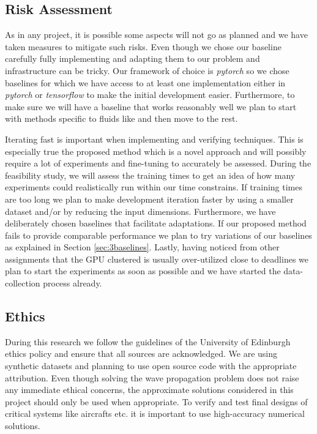 \documentclass[a4paper,11pt]{article}
\begin{document}
\subsection{Risk Assessment}
\label{sec:3risk}
As in any project, it is possible some aspects will not go as planned and we have taken measures to mitigate such risks. Even though we chose our baseline carefully fully implementing and adapting them to our problem and infrastructure can be tricky. Our framework of choice is \textit{pytorch} so we chose baselines for which we have access to at least one implementation either in \textit{pytorch} or \textit{tensorflow} to make the initial development easier. Furthermore, to make sure we will have a baseline that works reasonably well we plan to start with methods specific to fluids like \cite{sorteberg2018approximating} and then move to the rest. 

 Iterating fast is important when implementing and verifying techniques. This is especially true the proposed method which is a novel approach and will possibly require a lot of experiments and fine-tuning to accurately be assessed. During the feasibility study, we will assess the training times to get an idea of how many experiments could realistically run within our time constrains. If training times are too long we plan to make development iteration faster by using a smaller dataset and/or by reducing the input dimensions. Furthermore, we have deliberately chosen baselines that facilitate adaptations. If our proposed method fails to provide comparable performance we plan to try variations of our baselines as explained in Section \ref{sec:3baselines}. Lastly, having noticed from other assignments that the GPU clustered is usually over-utilized close to deadlines we plan to start the experiments as soon as possible and we have started the data-collection process already. 

\vskip -2mm
\subsection{Ethics}
\label{sec:3ethics}
During this research we follow the guidelines of the University of Edinburgh ethics policy and ensure that all sources are acknowledged. We are using synthetic datasets and planning to use open source code with the appropriate attribution. Even though solving the wave propagation problem does not raise any immediate ethical concerns, the approximate solutions  considered in this project should only be used when appropriate. To verify and test final designs of critical systems like aircrafts etc. it is important to use high-accuracy numerical solutions.
\end{document}
